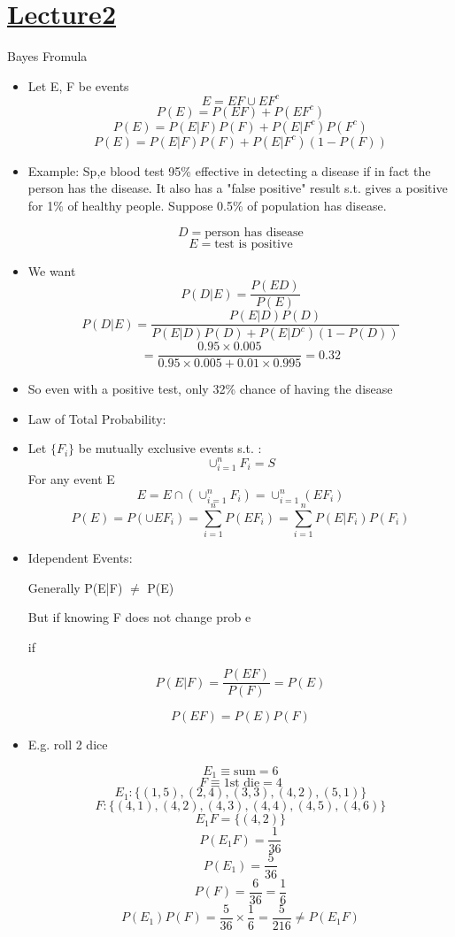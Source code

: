 \section[Lecture2]{\hyperlink{toc}{Lecture2}}

Bayes Fromula
\begin{itemize}
    \item Let E, F be events
    \[ E = EF \cup EF^c \]
    \[ P(E) = P(EF) + P(EF^c)\]
    \[ P(E) = P(E|F)P(F) + P(E|F^c)P(F^c)\]
    \[ P(E) = P(E|F)P(F) + P(E|F^c)(1 - P(F))\]
    \item Example: Sp,e blood test 95\% effective in detecting a disease if in fact the person has the disease. It also has a "false positive" result s.t. gives a positive for 1\% of healthy people. Suppose 0.5\% of population has disease. 
    
    \[ D = \text{person has disease}\]
    \[ E = \text{test is positive}\]

    \item We want 
    \[ P(D|E) = \frac{P(ED)}{P(E)}\]
    \[ P(D|E) = \frac{P(E|D)P(D)}{P(E|D)P(D) + P(E|D^c)(1 - P(D))}\]
    \[ = \frac{0.95 \times 0.005}{0.95 \times 0.005 + 0.01 \times 0.995} = 0.32\]
    \item So even with a positive test, only 32\% chance of having the disease
    \item Law of Total Probability:
    \item Let $\{F_i\}$ be mutually exclusive events s.t. :
    \[ \cup^n_{i=1} F_i = S\]
    For any event E
    \[ E = E \cap (\cup^n_{i=1} F_i) = \cup^n_{i=1} (E F_i)\]
    \[ P(E) = P(\cup E F_i) = \sum_{i=1}^n P(E F_i) = \sum_{i=1}^n P(E|F_i)P(F_i)\]

    \item Idependent Events:
    
    Generally P(E|F) $\neq$ P(E)

    But if knowing F does not change prob e

    if 

    \[ P(E|F) = \frac{P(EF)}{P(F)} = P(E)\]

    \[ \boxed{P(EF) = P(E)P(F)} \]


    \item E.g. roll 2 dice 
    
    \[ E_1 \equiv \text{sum} = 6 \]
    \[ F \equiv \text{1st die} = 4 \]
    \[ E_1: \{(1,5), (2,4), (3,3), (4,2), (5,1)\} \]
    \[ F: \{(4,1), (4,2), (4,3), (4,4), (4,5), (4,6)\} \]
    \[ E_1 F = \{(4,2)\} \]
    \[ P(E_1 F) = \frac{1}{36} \] 
    \[ P(E_1) = \frac{5}{36} \] 
    \[ P(F) = \frac{6}{36}  = \frac{1}{6}\]
    \[ P(E_1 ) P(F) = \frac{5}{36} \times \frac{1}{6} = \frac{5}{216} \neq P(E_1 F)\]


\end{itemize}
